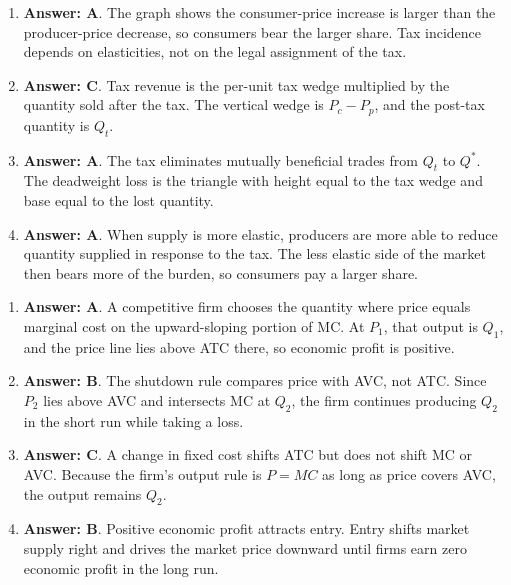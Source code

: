 \documentclass[10pt]{article}
\begin{document}
\begin{enumerate}[resume*=curves, leftmargin=*, itemsep=0.58em, topsep=0.18em, parsep=0pt]
\item \textbf{Answer: A}. The graph shows the consumer-price increase is larger than the producer-price decrease, so consumers bear the larger share. Tax incidence depends on elasticities, not on the legal assignment of the tax.
\item \textbf{Answer: C}. Tax revenue is the per-unit tax wedge multiplied by the quantity sold after the tax. The vertical wedge is $P_c-P_p$, and the post-tax quantity is $Q_t$.
\item \textbf{Answer: A}. The tax eliminates mutually beneficial trades from $Q_t$ to $Q^{*}$. The deadweight loss is the triangle with height equal to the tax wedge and base equal to the lost quantity.
\item \textbf{Answer: A}. When supply is more elastic, producers are more able to reduce quantity supplied in response to the tax. The less elastic side of the market then bears more of the burden, so consumers pay a larger share.
\end{enumerate}
\begin{enumerate}[resume*=curves, leftmargin=*, itemsep=0.58em, topsep=0.18em, parsep=0pt]
\item \textbf{Answer: A}. A competitive firm chooses the quantity where price equals marginal cost on the upward-sloping portion of MC. At $P_1$, that output is $Q_1$, and the price line lies above ATC there, so economic profit is positive.
\item \textbf{Answer: B}. The shutdown rule compares price with AVC, not ATC. Since $P_2$ lies above AVC and intersects MC at $Q_2$, the firm continues producing $Q_2$ in the short run while taking a loss.
\item \textbf{Answer: C}. A change in fixed cost shifts ATC but does not shift MC or AVC. Because the firm's output rule is $P=MC$ as long as price covers AVC, the output remains $Q_2$.
\item \textbf{Answer: B}. Positive economic profit attracts entry. Entry shifts market supply right and drives the market price downward until firms earn zero economic profit in the long run.
\end{enumerate}
\end{document}
